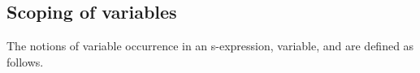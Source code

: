 %

\subsection{Scoping of variables} \label{sec:free}


The notions of  variable occurrence in an s-expression,
 variable, and  are defined as follows.
\smallskip

